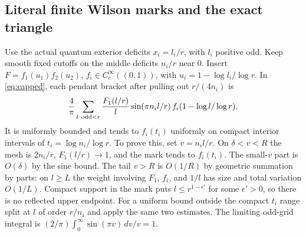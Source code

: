 \subsection{Literal finite Wilson marks and the exact triangle}
Use the actual quantum exterior deficits \(x_i=l_i/r\), with \(l_i\) positive odd. Keep smooth fixed cutoffs on the middle deficits \(n_i/r\) near \(0\). Insert \(F= f_1(u_1)f_2(u_2)\), \(f_i\in C_c^\infty((0,1))\), with \(u_i=1-\log l_i/\log r\). In \eqref{eq:capped}, each pendant bracket after pulling out \(r/(4n_i)\) is
\[
 \frac4\pi\sum_{l\ {\rm odd}<r}\frac{F_1(l/r)}l
     \sin(\pi n_i l/r)\,f_i(1-\log l/\log r).
\]
It is uniformly bounded and tends to \(f_i(t_i)\) uniformly on compact interior intervals of \(t_i=\log n_i/\log r\). To prove this, set \(v=n_i l/r\). On \(\delta<v<R\) the mesh is \(2n_i/r\), \(F_1(l/r)\to1\), and the mark tends to \(f_i(t_i)\). The small-\(v\) part is \(O(\delta)\) by the sine bound. The tail \(v>R\) is \(O(1/R)\) by geometric summation by parts: on \(l\ge L\) the weight involving \(F_1\), \(f_i\), and \(1/l\) has size and total variation \(O(1/L)\). Compact support in the mark puts \(l\le r^{1-\epsilon'}\) for some \(\epsilon'>0\), so there is no reflected upper endpoint. For a uniform bound outside the compact \(t_i\) range split at \(l\) of order \(r/n_i\) and apply the same two estimates. The limiting odd-grid integral is \((2/\pi)\int_0^\infty\sin(\pi v)\,dv/v=1\).

